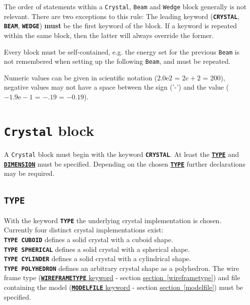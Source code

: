 \documentclass[a4paper]{article}
\newcommand{\Class}[1]{\texttt{#1}\xspace}
\newcommand{\Keyword}[1]{\texttt{\textbf{#1}}\xspace}
\newcommand{\SB}{\\[0.2em]}
\begin{document}
The order of statements within a \Class{Crystal}, \Class{Beam} and \Class{Wedge} block generally is not relevant.
There are two exceptions to this rule: The leading keyword (\Keyword{CRYSTAL}, \Keyword{BEAM}, \Keyword{WEDGE}) \textbf{must} be the first keyword of the block. If a keyword is repeated within the same block, then
the latter will always override the former.

Every block must be self-contained, e.g. the energy set for the previous \Class{Beam} is not remembered when setting up the following \Class{Beam}, and must be repeated.

Numeric values can be given in scientific notation ($2.0\mbox{e}2$ = $2e+2$ = 200), negative values may not have a space between the sign ('-') and the value ($-1.9\mbox{e}-1$ = $-.19$ = $-0.19$).
\label{numberspec}

\section{\Class{Crystal} block}

A \Class{Crystal} block must begin with the keyword \Keyword{CRYSTAL}.
At least the \hyperref[crystaltype]{\Keyword{TYPE}} and \hyperref[crystaldimension]{\Keyword{DIMENSION}} must be specified.
Depending on the chosen \hyperref[crystaltype]{\Keyword{TYPE}} further declarations may be required.


\subsection{\Keyword{TYPE}}
\label{crystaltype}
With the keyword \Keyword{TYPE} the underlying crystal implementation is chosen.
Currently four distinct crystal implementations exist:\SB

\noindent \Keyword{TYPE CUBOID}
defines a solid crystal with a cuboid shape.\SB

\noindent \Keyword{TYPE SPHERICAL}
defines a solid crystal with a spherical shape.\SB

\noindent \Keyword{TYPE CYLINDER}
defines a solid crystal with a cylindrical shape.\SB

\noindent \Keyword{TYPE POLYHEDRON}
defines an arbitrary crystal shape as a polyhedron. The wire frame type (\hyperref[wireframetype]{\Keyword{WIREFRAMETYPE} keyword} - section \hyperref[wireframetype]{section~\ref*{wireframetype}}) and file containing the model (\hyperref[modelfile]{\Keyword{MODELFILE} keyword} - section \hyperref[modelfile]{section~\ref*{modelfile}}) must be specified.\SB
\end{document}
